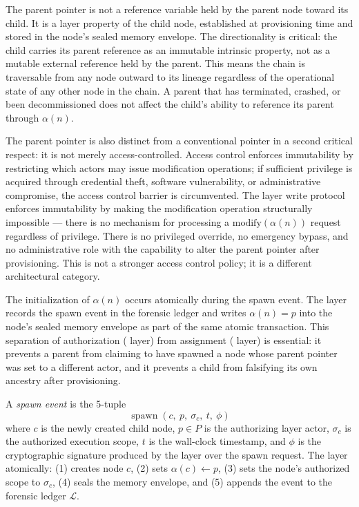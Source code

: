 The parent pointer is not a reference variable held by the parent node toward its child. It is a \fact{} layer property of the child node, established at provisioning time and stored in the node's sealed memory envelope. The directionality is critical: the child carries its parent reference as an immutable intrinsic property, not as a mutable external reference held by the parent. This means the chain is traversable from any node outward to its lineage regardless of the operational state of any other node in the chain. A parent that has terminated, crashed, or been decommissioned does not affect the child's ability to reference its parent through $\alpha(n)$.

The parent pointer is also distinct from a conventional pointer in a second critical respect: it is not merely access-controlled. Access control enforces immutability by restricting which actors may issue modification operations; if sufficient privilege is acquired through credential theft, software vulnerability, or administrative compromise, the access control barrier is circumvented. The \fact{} layer write protocol enforces immutability by making the modification operation structurally impossible --- there is no mechanism for processing a $\text{modify}(\alpha(n))$ request regardless of privilege. There is no privileged override, no emergency bypass, and no administrative role with the capability to alter the parent pointer after provisioning. This is not a stronger access control policy; it is a different architectural category.

The initialization of $\alpha(n)$ occurs atomically during the spawn event. The \fact{} layer records the spawn event in the forensic ledger and writes $\alpha(n) = p$ into the node's sealed memory envelope as part of the same atomic transaction. This separation of authorization (\purpose{} layer) from assignment (\fact{} layer) is essential: it prevents a parent from claiming to have spawned a node whose parent pointer was set to a different actor, and it prevents a child from falsifying its own ancestry after provisioning.

\begin{dfn}
\label{dfn:spawn-event}
A \emph{spawn event} is the 5-tuple
\begin{equation}
\operatorname{spawn}(c,\ p,\ \sigma_c,\ t,\ \phi)
\end{equation}
where $c$ is the newly created child node, $p \in P$ is the authorizing \purpose{} layer actor, $\sigma_c$ is the authorized execution scope, $t$ is the wall-clock timestamp, and $\phi$ is the cryptographic signature produced by the \purpose{} layer over the spawn request. The \fact{} layer atomically: (1) creates node $c$, (2) sets $\alpha(c) \leftarrow p$, (3) sets the node's authorized scope to $\sigma_c$, (4) seals the memory envelope, and (5) appends the event to the forensic ledger $\mathcal{L}$.
\end{dfn}

